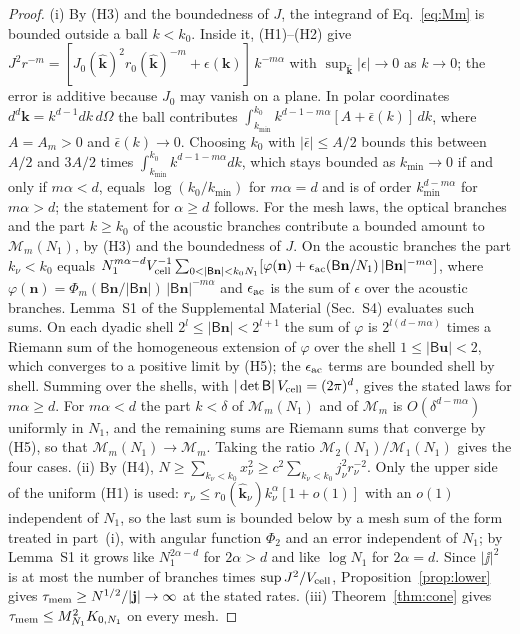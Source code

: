 \begin{proof}
(i) By (H3) and the boundedness of $J$, the integrand of Eq.~\eqref{eq:Mm} is bounded outside a ball
$k<k_0$. Inside it, (H1)--(H2) give
$J^2r^{-m}=[J_0(\hat{\mathbf k})^2r_0(\hat{\mathbf k})^{-m}+\epsilon(\mathbf k)]\,k^{-m\alpha}$ with
$\sup_{\hat{\mathbf k}}|\epsilon|\to0$ as $k\to0$; the error is additive because $J_0$ may vanish on a
plane. In polar coordinates $d^d\mathbf k=k^{d-1}dk\,d\Omega$ the ball contributes
$\int_{k_{\min}}^{k_0}k^{d-1-m\alpha}[A+\bar\epsilon(k)]\,dk$, where $A=A_m>0$ and $\bar\epsilon(k)\to0$.
Choosing $k_0$ with $|\bar\epsilon|\le A/2$ bounds this between $A/2$ and $3A/2$ times
$\int_{k_{\min}}^{k_0}k^{d-1-m\alpha}dk$, which stays bounded as $k_{\min}\to0$ if and only if $m\alpha<d$,
equals $\log(k_0/k_{\min})$ for $m\alpha=d$ and is of order $k_{\min}^{d-m\alpha}$ for $m\alpha>d$; the
statement for $\alpha\ge d$ follows. For the mesh laws, the optical branches and the part $k\ge k_0$ of
the acoustic branches contribute a bounded amount to $\mathcal M_m(N_1)$, by (H3) and the boundedness of
$J$. On the acoustic
branches the part $k_\nu<k_0$ equals
$N_1^{m\alpha-d}V_{\rm cell}^{-1}\sum_{0<|\mathsf B\mathbf n|<k_0N_1}[\varphi(\mathbf n)+\epsilon_{\rm ac}(\mathsf B\mathbf n/N_1)\,|\mathsf B\mathbf n|^{-m\alpha}]$,
where $\varphi(\mathbf n)=\Phi_m(\mathsf B\mathbf n/|\mathsf B\mathbf n|)\,|\mathsf B\mathbf n|^{-m\alpha}$ and
$\epsilon_{\rm ac}$ is the sum of $\epsilon$ over the acoustic branches. Lemma~S1 of the Supplemental
Material (Sec.~S4) evaluates such sums. On each dyadic shell $2^l\le|\mathsf B\mathbf n|<2^{l+1}$ the sum
of $\varphi$ is $2^{l(d-m\alpha)}$ times a Riemann sum of the homogeneous extension of $\varphi$ over the
shell $1\le|\mathsf B\mathbf u|<2$, which converges to a positive limit by (H5); the $\epsilon_{\rm ac}$
terms are bounded shell by shell. Summing over the shells, with $|\det\mathsf B|\,V_{\rm cell}=(2\pi)^d$, gives
the stated laws for $m\alpha\ge d$. For $m\alpha<d$ the part $k<\delta$ of $\mathcal M_m(N_1)$ and of
$\mathcal M_m$ is $O(\delta^{d-m\alpha})$ uniformly in $N_1$, and the remaining sums are Riemann sums that
converge by (H5), so that $\mathcal M_m(N_1)\to\mathcal M_m$. Taking the ratio $\mathcal M_2(N_1)/\mathcal M_1(N_1)$ gives the four
cases.
(ii) By (H4), $N\ge\sum_{k_\nu<k_0}x_\nu^2\ge c^2\sum_{k_\nu<k_0}j_\nu^2r_\nu^{-2}$. Only the upper side
of the uniform (H1) is used: $r_\nu\le r_0(\hat{\mathbf k}_\nu)k_\nu^\alpha[1+o(1)]$ with an $o(1)$
independent of $N_1$, so the last sum is bounded below by a mesh sum of the form treated in part~(i),
with angular function $\Phi_2$ and an error independent of $N_1$; by Lemma~S1 it grows like
$N_1^{2\alpha-d}$ for $2\alpha>d$ and like $\log N_1$ for $2\alpha=d$. Since $|\jj|^2$ is at most the
number of branches times $\sup J^2/V_{\rm cell}$, Proposition~\ref{prop:lower} gives
$\tau_{\rm mem}\ge N^{1/2}/|\mathbf j|\to\infty$ at the stated rates.
(iii) Theorem~\ref{thm:cone} gives $\tau_{\rm mem}\le M_{N_1}^2K_{0,N_1}$ on every mesh.
\end{proof}

